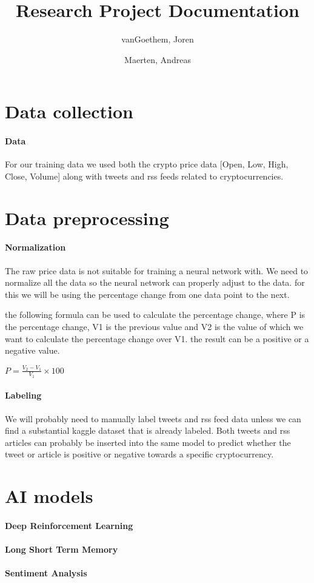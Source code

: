 \documentclass[a4paper]{article}
\begin{document}
\begin{titlepage}
    \author{
        vanGoethem, Joren 
        \and 
        Maerten, Andreas
    }
    \title{Research Project Documentation}
\end{titlepage}

\maketitle
\newpage
\tableofcontents
\newpage


\section{Data collection}
\paragraph{Data}
    For our training data we used both the crypto price data [Open, Low, High, Close, Volume] along with tweets and rss feeds related to cryptocurrencies.


\section{Data preprocessing}
\paragraph{Normalization}
    The raw price data is not suitable for training a neural network with. We need to normalize all the data so the neural network can properly adjust to the data. for this we will be using the percentage change from one data point to the next.

    the following formula can be used to calculate the percentage change, where P is the percentage change, V1 is the previous value and V2 is the value of which we want to calculate the percentage change over V1. the result can be a positive or a negative value.

    \large \( P = \frac{ V_2 - V_1 }{ V_1 } \times 100 \)

\paragraph{Labeling}
    We will probably need to manually label tweets and rss feed data unless we can find a substantial kaggle dataset that is already labeled. Both tweets and rss articles can probably be inserted into the same model to predict whether the tweet or article is positive or negative towards a specific cryptocurrency.


\section{AI models}
\paragraph{Deep Reinforcement Learning}

\paragraph{Long Short Term Memory}

\paragraph{Sentiment Analysis}
\end{document}
